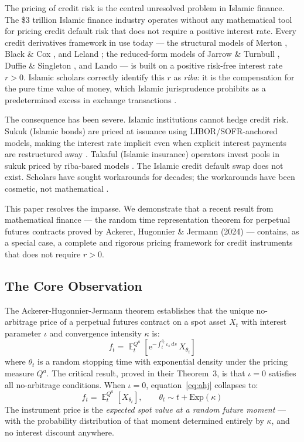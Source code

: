 \documentclass[10pt,twocolumn]{article}
\theoremstyle{plain}
\theoremstyle{definition}
\DeclareMathOperator{\E}{\mathbb{E}}
\newcommand{\Qa}{Q^a}
\begin{document}
The pricing of credit risk is the central unresolved problem in Islamic
finance. The \$3 trillion Islamic finance industry \cite{IFSB2024} operates
without any mathematical tool for pricing credit default risk that does not
require a positive interest rate. Every credit derivatives framework in use
today --- the structural models of Merton \cite{Merton1974}, Black \&
Cox \cite{BlackCox1976}, and Leland \cite{Leland1994}; the reduced-form
models of Jarrow \& Turnbull \cite{JarrowTurnbull1995}, Duffie \&
Singleton \cite{DuffieSingleton1999}, and Lando \cite{Lando1998} --- is
built on a positive risk-free interest rate $r > 0$. Islamic scholars
correctly identify this $r$ as \textit{riba}: it is the compensation for
the pure time value of money, which Islamic jurisprudence prohibits as a
predetermined excess in exchange transactions \cite{ElGamal2006,Usmani2002}.

The consequence has been severe. Islamic institutions cannot hedge credit
risk. Sukuk (Islamic bonds) are priced at issuance using LIBOR/SOFR-anchored
models, making the interest rate implicit even when explicit interest
payments are restructured away \cite{KhanAbdallah2017}. Takaful (Islamic
insurance) operators invest pools in sukuk priced by riba-based models
\cite{Htay2012}. The Islamic credit default swap does not exist. Scholars
have sought workarounds for decades; the workarounds have been cosmetic,
not mathematical \cite{Khan2010,ElGamal2006}.

This paper resolves the impasse. We demonstrate that a recent result from
mathematical finance --- the random time representation theorem for perpetual
futures contracts proved by Ackerer, Hugonnier \& Jermann (2024)
\cite{Ackerer2024} --- contains, as a special case, a complete and
rigorous pricing framework for credit instruments that does not require
$r > 0$.

\subsection*{The Core Observation}

The Ackerer-Hugonnier-Jermann theorem establishes that the unique
no-arbitrage price of a perpetual futures contract on a spot asset $X_t$
with interest parameter $\iota$ and convergence intensity $\kappa$ is:
\begin{equation}
f_t = \E^{\Qa}_t\!\left[\mathrm{e}^{-\int_t^{\theta_t}\!\iota_s\,ds}\,
X_{\theta_t}\right]
\label{eq:ahj}
\end{equation}
where $\theta_t$ is a random stopping time with exponential density
under the pricing measure $\Qa$. The critical result, proved in their
Theorem~3, is that $\iota = 0$ satisfies all no-arbitrage conditions.
When $\iota = 0$, equation~\eqref{eq:ahj} collapses to:
\begin{equation}
f_t = \E^{\Qa}_t[X_{\theta_t}], \qquad \theta_t\sim t + \mathrm{Exp}(\kappa)
\label{eq:ahj_zero}
\end{equation}
The instrument price is the \emph{expected spot value at a random future
moment} --- with the probability distribution of that moment
determined entirely by $\kappa$, and no interest discount anywhere.
\end{document}
